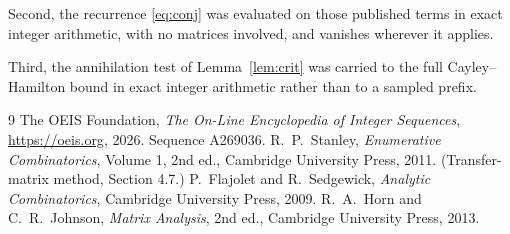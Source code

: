 \documentclass[11pt,a4paper]{article}
\theoremstyle{plain}
\theoremstyle{definition}
\begin{document}
Second, the recurrence \eqref{eq:conj} was evaluated on those published terms in exact
integer arithmetic, with no matrices involved, and vanishes wherever it applies.

Third, the annihilation test of Lemma~\ref{lem:crit} was carried to the full
Cayley--Hamilton bound in exact integer arithmetic rather than to a sampled prefix.

\begin{thebibliography}{9}
 The OEIS Foundation, \emph{The On-Line Encyclopedia of Integer
Sequences}, \url{https://oeis.org}, 2026. Sequence A269036.
 R.~P.~Stanley, \emph{Enumerative Combinatorics}, Volume 1, 2nd ed.,
Cambridge University Press, 2011. (Transfer-matrix method, Section 4.7.)
 P.~Flajolet and R.~Sedgewick, \emph{Analytic Combinatorics}, Cambridge
University Press, 2009.
 R.~A.~Horn and C.~R.~Johnson, \emph{Matrix Analysis}, 2nd ed., Cambridge
University Press, 2013.
\end{thebibliography}
\end{document}
